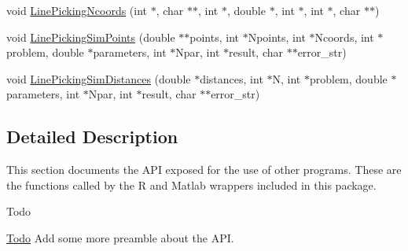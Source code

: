 \begin{DoxyCompactItemize}
void \hyperlink{group__api_ga89bd29435ffe1826e97dafb2b0536de1}{Line\-Picking\-Ncoords} (int $\ast$, char $\ast$$\ast$, int $\ast$, double $\ast$, int $\ast$, int $\ast$, char $\ast$$\ast$)
\item 
void \hyperlink{group__api_gad3880c7898c35953c9c55ced33beb222}{Line\-Picking\-Sim\-Points} (double $\ast$$\ast$points, int $\ast$Npoints, int $\ast$Ncoords, int $\ast$problem, double $\ast$parameters, int $\ast$Npar, int $\ast$result, char $\ast$$\ast$error\-\_\-str)
\item 
void \hyperlink{group__api_gade24923f75c83155e6cf15f3d7d7cb09}{Line\-Picking\-Sim\-Distances} (double $\ast$distances, int $\ast$N, int $\ast$problem, double $\ast$parameters, int $\ast$Npar, int $\ast$result, char $\ast$$\ast$error\-\_\-str)
\end{DoxyCompactItemize}


\subsection{Detailed Description}
This section documents the A\-P\-I exposed for the use of other programs. These are the functions called by the R and Matlab wrappers included in this package. \begin{DoxyRefDesc}{Todo}
\item[\hyperlink{todo__todo000013}{Todo}]Add some more preamble about the A\-P\-I.\end{DoxyRefDesc}


